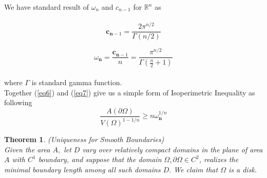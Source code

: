 \documentclass[oneside]{book}
\newtheorem{theorem}{Theorem}[section]
\begin{document}
	
	
	We have standard result of $\omega_{n}$ and $c_{n-1}$ for $\mathbb{R}^{n}$ as  \\\\
	\begin{equation}
	\label{eq7}  
	\mathbf{c}_{\mathbf{n}-1} = \frac{2 \pi^{n / 2}}{\Gamma(n / 2)}
	\end{equation}
	
	
	
	\begin{equation}
	\label{eq8}  
	\omega_{\mathbf{n} } = \frac{\mathbf{c}_{\mathbf{n}-1}}{n} =\frac{\pi^{n / 2}}{\Gamma\left(\frac{n}{2}+1\right)}
	\end{equation} \\
	where $\Gamma$ is standard gamma function.\\
	 Together (\ref{eq6}) and 
	(\ref{eq7}) give us a simple form of Isoperimetric Inequality as following\\
	\begin{equation}
	\label{eq9}  
	\frac{A(\partial \Omega)}{V(\Omega)^{1-1 / n}} \geq n \omega_{\mathbf{n}}^{1 / n}
	\end{equation}
	
	
	
	
	
	
	\begin{theorem}
		{(Uniqueness for Smooth Boundaries)}
		\label{t:1} \\
		Given
		the area $A,$ let $D$ vary over relatively compact domains in the plane of area $A$
		with $C^{1}$ boundary, and suppose that the domain $\Omega, \partial \Omega \in C^{2}$, realizes the minimal
		boundary length among all such domains $D .$ We claim that $\Omega$ is a disk.
	\end{theorem}
	
\end{document}
